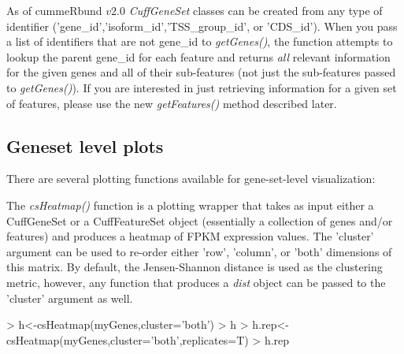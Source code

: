 \documentclass[10pt]{article}
\newcommand{\Rpackage}[1]{\textsf{#1}}
\newcommand{\Rclass}[1]{{\textit{#1}}}
\newcommand{\Rmethod}[1]{{\textit{#1}}}
\begin{document}
As of \Rpackage{cummeRbund} $v2.0$ \Rclass{CuffGeneSet} classes can be created from any type of identifier ('gene\_id','isoform\_id','TSS\_group\_id', or 'CDS\_id'). When you pass a list of identifiers that are not gene\_id to \Rmethod{getGenes()}, the function attempts to lookup the parent gene\_id for each feature and returns \emph{all} relevant
information for the given genes and all of their sub-features (not just the sub-features passed to \Rmethod{getGenes()}).  If you are interested in just retrieving information for a given set of features, please use the new \Rmethod{getFeatures()} method described later.

\subsection{Geneset level plots}
There are several plotting functions available for gene-set-level visualization:

The \Rmethod{csHeatmap()} function is a plotting wrapper that takes as input either a CuffGeneSet or a CuffFeatureSet object (essentially a collection of genes and/or features) and produces a heatmap of FPKM expression values.  The 'cluster' argument can be used to re-order either 'row', 'column', or 'both' dimensions of this matrix.
By default, the Jensen-Shannon distance is used as the clustering metric, however, any function that produces a \Rclass{dist} object can be passed to the 'cluster' argument as well.

\begin{Schunk}
\begin{Sinput}
> h<-csHeatmap(myGenes,cluster='both')
> h
> h.rep<-csHeatmap(myGenes,cluster='both',replicates=T)
> h.rep
\end{Sinput}
\end{Schunk}

\begin{figure}[htp]
	\begin{center}
	
	\qquad
	\end{center}
\end{figure}
\end{document}
